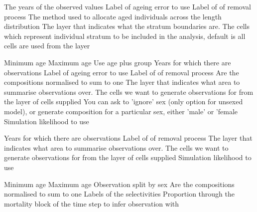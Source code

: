 \par\textbf{}\par
{} {The years of the observed values}
 {Label of ageing error to use}
 {Label of of removal process}
 {The method used to allocate aged individuals across the length distribution}
 {The layer that indicates what the stratum boundaries are.}
 {The cells which represent individual stratum to be included in the analysis, default is all cells are used from the layer}
\par\textbf{}\par
{} {Minimum age}
 {Maximum age}
 {Use age plus group}
 {Years for which there are observations}
 {Label of ageing error to use}
 {Label of of removal process}
 {Are the compositions normalised to sum to one}
 {The layer that indicates what area to summarise observations over.}
 {The cells we want to generate observations for from the layer of cells supplied}
 {You can ask to 'ignore' sex (only option for unsexed model), or generate composition for a particular sex, either 'male' or 'female}
 {Simulation likelihood to use}
\par\textbf{}\par
{} {Years for which there are observations}
 {Label of of removal process}
 {The layer that indicates what area to summarise observations over.}
 {The cells we want to generate observations for from the layer of cells supplied}
 {Simulation likelihood to use}
\par\textbf{}\par
{} {Minimum age}
 {Maximum age}
 {Observation split by sex}
 {Are the compositions normalised to sum to one}
 {Labels of the selectivities}
 {Proportion through the mortality block of the time step to infer observation with}
